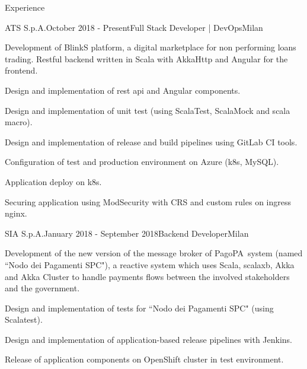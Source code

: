 \documentclass{resume} %
\begin{document}

\begin{rSection}{Experience}

\begin{rSubsection}{ATS S.p.A.}{October 2018 - Present}{Full Stack Developer | DevOps}{Milan}
\item Development of BlinkS platform, a digital marketplace for non performing loans trading.
Restful backend written in Scala with AkkaHttp and Angular for the frontend.
\item Design and implementation of rest api and Angular components.
\item Design and implementation of unit test (using ScalaTest, ScalaMock and scala macro).
\item Design and implementation of release and build pipelines using GitLab CI tools.
\item Configuration of test and production environment on Azure (k8s, MySQL).
\item Application deploy on k8s.
\item Securing application using ModSecurity with CRS and custom rules on ingress nginx.
\end{rSubsection}


\begin{rSubsection}{SIA S.p.A.}{January 2018 - September 2018}{Backend Developer}{Milan}
\item Development of the new version of the message broker of PagoPA\textregistered~system (named ``Nodo dei Pagamenti SPC"),
a reactive system which uses Scala, scalaxb, Akka and Akka Cluster to handle payments flows between the involved stakeholders and the government.
\item Design and implementation of tests for ``Nodo dei Pagamenti SPC" (using Scalatest).
\item Design and implementation of application-based release pipelines with Jenkins.
\item Release of application components on OpenShift cluster in test environment.
\end{rSubsection}



\end{rSection}
\end{document}
